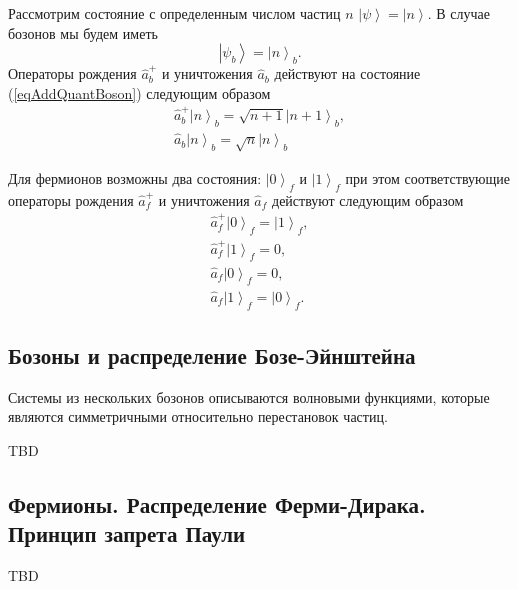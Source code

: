 Рассмотрим состояние с определенным числом частиц $n$
$\left|\psi\right> = \left|n\right>$. В случае бозонов мы будем иметь 
\begin{equation}
\left|\psi_b\right> = \left|n\right>_b.
\label{eqAddQuantBoson}
\end{equation}
Операторы рождения $\hat{a}_b^{+}$ и уничтожения $\hat{a}_b$ действуют на
состояние (\ref{eqAddQuantBoson}) следующим образом
\begin{eqnarray}
\hat{a}_b^{+}\left|n\right>_b = \sqrt{n+1}\left|n+1\right>_b, 
\nonumber \\
\hat{a}_b\left|n\right>_b = \sqrt{n}\left|n\right>_b
\nonumber
\end{eqnarray}

Для фермионов возможны два состояния: $\left|0\right>_f$ и
$\left|1\right>_f$ при этом соответствующие операторы рождения
$\hat{a}_f^{+}$ и уничтожения $\hat{a}_f$ действуют следующим образом
\begin{eqnarray}
\hat{a}_f^{+}\left|0\right>_f = \left|1\right>_f, 
\nonumber \\
\hat{a}_f^{+}\left|1\right>_f = 0, 
\nonumber \\
\hat{a}_f\left|0\right>_f = 0, 
\nonumber \\
\hat{a}_f\left|1\right>_f = \left|0\right>_f.
\nonumber
\end{eqnarray}


\subsection{Бозоны и распределение Бозе-Эйнштейна}
Системы из нескольких бозонов описываются волновыми функциями, которые
являются симметричными относительно перестановок частиц.

TBD

\subsection{Фермионы. Распределение Ферми-Дирака. Принцип запрета Паули}

TBD
